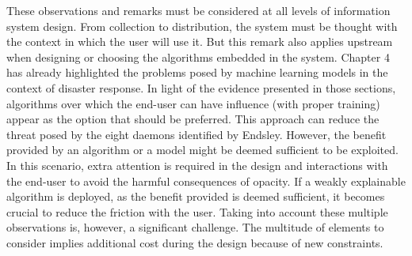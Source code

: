 These observations and remarks must be considered at all levels of information system design.
From collection to distribution, the system must be thought with the context in which the user will use it.
But this remark also applies upstream when designing or choosing the algorithms embedded in the system.
Chapter 4 has already highlighted the problems posed by machine learning models in the context of disaster response.
In light of the evidence presented in those sections, algorithms over which the end-user can have influence (with proper training) appear as the option that should be preferred.
This approach can reduce the threat posed by the eight daemons identified by Endsley.
However, the benefit provided by an algorithm or a model might be deemed sufficient to be exploited.
In this scenario, extra attention is required in the design and interactions with the end-user to avoid the harmful consequences of opacity.
If a weakly explainable algorithm is deployed, as the benefit provided is deemed sufficient, it becomes crucial to reduce the friction with the user.
Taking into account these multiple observations is, however, a significant challenge.
The multitude of elements to consider implies additional cost during the design because of new constraints.

